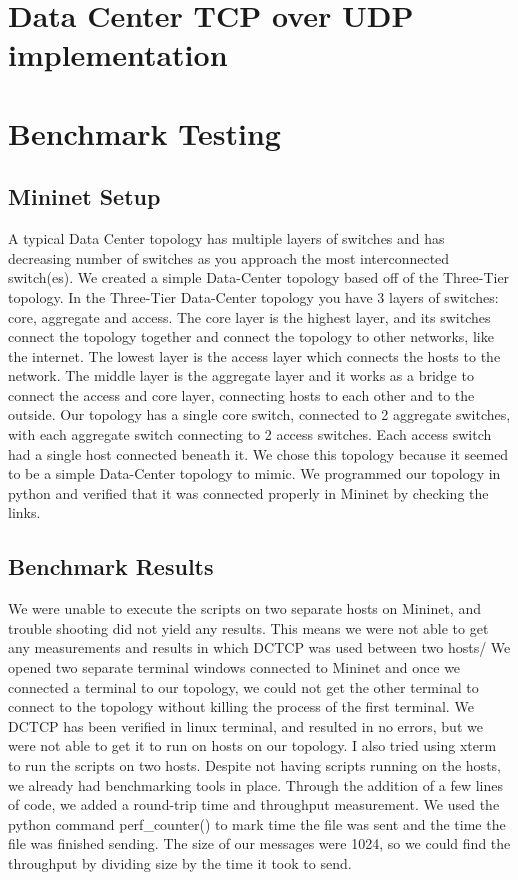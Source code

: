 \documentclass[%
 reprint,
amsmath,amssymb,
aps,
]{revtex4-2}
\begin{document}
\section{Data Center TCP over UDP implementation}

\section{Benchmark Testing}
\subsection{Mininet Setup}
A typical Data Center topology has multiple layers of switches and has decreasing number of switches as you approach the most interconnected switch(es). We created a simple Data-Center topology based off of the Three-Tier topology. In the Three-Tier Data-Center topology you have 3 layers of switches: core, aggregate and access. The core layer is the highest layer, and its switches connect the topology together and connect the topology to other networks, like the internet. The lowest layer is the access layer which connects the hosts to the network. The middle layer is the aggregate layer and it works as a bridge to connect the access and core layer, connecting hosts to each other and to the outside. Our topology has a single core switch, connected to 2 aggregate switches, with each aggregate switch connecting to 2 access switches. Each access switch had a single host connected beneath it. We chose this topology because it seemed to be a simple Data-Center topology to mimic. We programmed our topology in python and verified that it was connected properly in Mininet by checking the links. 
\subsection{Benchmark Results}
We were unable to execute the scripts on two separate hosts on Mininet, and trouble shooting did not yield any results. This means we were not able to get any measurements and results in which DCTCP was used between two hosts/ We opened two separate terminal windows connected to Mininet and once we connected a terminal to our topology, we could not get the other terminal to connect to the topology without killing the process of the first terminal. We DCTCP has been verified in linux terminal, and resulted in no errors, but we were not able to get it to run on hosts on our topology. I also tried using xterm to run the scripts on two hosts. Despite not having scripts running on the hosts, we already had benchmarking tools in place. Through the addition of a few lines of code, we added a round-trip time and throughput measurement. We used the python command perf\_counter() to mark time the file was sent and the time the file was finished sending. The size of our messages were 1024, so we could find the throughput by dividing size by the time it took to send.
\end{document}

